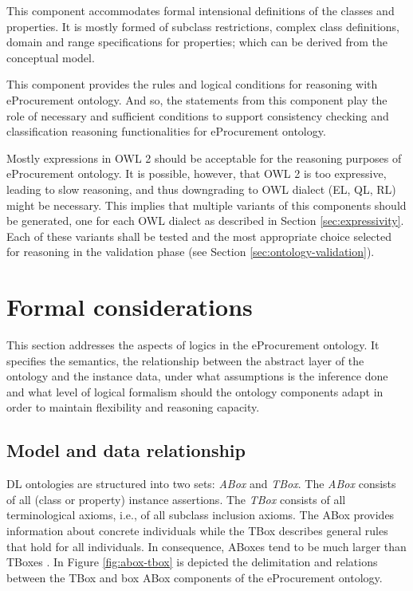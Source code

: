	This component accommodates formal intensional definitions of the classes and properties. It is mostly formed of subclass restrictions, complex class definitions, domain and range specifications for properties; which can be derived from the conceptual model. 
	
	This component provides the rules and logical conditions for reasoning with eProcurement ontology. And so, the statements from this component play the role of necessary and sufficient conditions to support consistency checking and classification reasoning functionalities for eProcurement ontology. 
	
	Mostly expressions in OWL 2 should be acceptable for the reasoning purposes of eProcurement ontology. It is possible, however, that OWL 2 is too expressive, leading to slow reasoning, and thus downgrading to OWL dialect (EL, QL, RL) might be necessary. This implies that multiple variants of this components should be generated, one for each OWL dialect as described in Section \ref{sec:expressivity}. Each of these variants shall be tested and the most appropriate choice selected for reasoning in the validation phase (see Section \ref{sec:ontology-validation}). 
		
		
\section{Formal considerations}	
\label{sec:formal-considerations}

	This section addresses the aspects of logics in the eProcurement ontology. It specifies the semantics, the relationship between the abstract layer of the ontology and the instance data, under what assumptions is the inference done and what level of logical formalism should the ontology components adapt in order to maintain flexibility and reasoning capacity. 
	
	\subsection{Model and data relationship}
	\label{sec:model-data}
	
	DL ontologies are structured into two sets: \textit{ABox} and \textit{TBox}. The \textit{ABox} consists of all (class or property) instance assertions. The \textit{TBox} consists of all terminological axioms, i.e., of all subclass inclusion axioms. The ABox provides information about concrete individuals while the TBox describes general rules that hold for all individuals. In consequence, ABoxes tend to be much larger than TBoxes \citep{krotzsch2012owl}. In Figure \ref{fig:abox-tbox} is depicted the delimitation and relations between the TBox and box ABox components of the eProcurement ontology.
	

